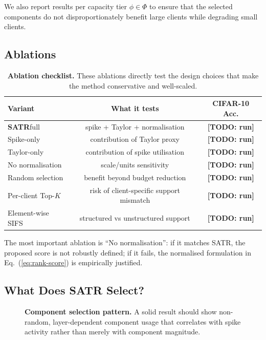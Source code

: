 \documentclass{article} %
\newcommand{\method}{SATR\xspace}
\newcommand{\methodbf}{\textbf{SATR}}
\newcommand{\todo}[1]{{\color{red}\textbf{[TODO: #1]}}}
\begin{document}
We also report results per capacity tier $\phi\in\Phi$ to ensure that the selected components do not disproportionately benefit large clients while degrading small clients.

\subsection{Ablations}
\label{sec:exp-ablation}

\begin{table}[t]
\centering
\caption{\textbf{Ablation checklist.} These ablations directly test the design choices that make the method conservative and well-scaled.}
\label{tab:ablation}
\small
\begin{tabular}{lcc}
\toprule
Variant & What it tests & CIFAR-10 Acc. \\
\midrule
\methodbf full & spike + Taylor + normalisation & \todo{run} \\
Spike-only & contribution of Taylor proxy & \todo{run} \\
Taylor-only & contribution of spike utilisation & \todo{run} \\
No normalisation & scale/units sensitivity & \todo{run} \\
Random selection & benefit beyond budget reduction & \todo{run} \\
Per-client Top-$K$ & risk of client-specific support mismatch & \todo{run} \\
Element-wise SIFS & structured vs unstructured support & \todo{run} \\
\bottomrule
\end{tabular}
\end{table}

The most important ablation is ``No normalisation'': if it matches \method, the proposed score is not robustly defined; if it fails, the normalised formulation in Eq.~(\ref{eq:rank-score}) is empirically justified.

\subsection{What Does \method Select?}
\label{sec:exp-mask}

\begin{figure}[t]
\centering
{}
\caption{\textbf{Component selection pattern.} A solid result should show non-random, layer-dependent component usage that correlates with spike activity rather than merely with component magnitude.}
\label{fig:mask-vis}
\end{figure}
\end{document}
